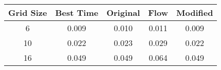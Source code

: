 \begin{tabular}{|c|c|c|c|c|}
\hline
Grid Size & Best Time & Original & Flow & Modified \\
\hline
6 & 0.009 & 0.010 & 0.011 & 0.009 \\
10 & 0.022 & 0.023 & 0.029 & 0.022 \\
16 & 0.049 & 0.049 & 0.064 & 0.049 \\
\hline
\end{tabular}